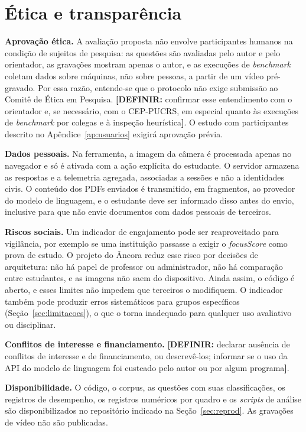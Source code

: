\documentclass[portuguese,oneside]{tcc}
\newcommand{\ferramenta}{Âncora\xspace}
\newcommand{\estr}[1]{\emph{#1}}
\newcommand{\fs}{\emph{focusScore}\xspace}
\newcommand{\definir}[1]{\textcolor{orange!75!black}{\textbf{[DEFINIR:} #1\textbf{]}}}
\begin{document}
\section{\label{sec:etica}Ética e transparência}

\textbf{Aprovação ética.} A avaliação proposta não envolve participantes humanos na condição de sujeitos de pesquisa: as questões são avaliadas pelo autor e pelo orientador, as gravações mostram apenas o autor, e as execuções de \estr{benchmark} coletam dados sobre máquinas, não sobre pessoas, a partir de um vídeo pré-gravado. Por essa razão, entende-se que o protocolo não exige submissão ao Comitê de Ética em Pesquisa. \definir{confirmar esse entendimento com o orientador e, se necessário, com o CEP-PUCRS, em especial quanto às execuções de \estr{benchmark} por colegas e à inspeção heurística}. O estudo com participantes descrito no Apêndice~\ref{ap:usuarios} exigirá aprovação prévia.

\textbf{Dados pessoais.} Na ferramenta, a imagem da câmera é processada apenas no navegador e só é ativada com a ação explícita do estudante. O servidor armazena as respostas e a telemetria agregada, associadas a sessões e não a identidades civis. O conteúdo dos PDFs enviados é transmitido, em fragmentos, ao provedor do modelo de linguagem, e o estudante deve ser informado disso antes do envio, inclusive para que não envie documentos com dados pessoais de terceiros.

\textbf{Riscos sociais.} Um indicador de engajamento pode ser reaproveitado para vigilância, por exemplo se uma instituição passasse a exigir o \fs como prova de estudo. O projeto do \ferramenta reduz esse risco por decisões de arquitetura: não há papel de professor ou administrador, não há comparação entre estudantes, e as imagens não saem do dispositivo. Ainda assim, o código é aberto, e esses limites não impedem que terceiros o modifiquem. O indicador também pode produzir erros sistemáticos para grupos específicos (Seção~\ref{sec:limitacoes}), o que o torna inadequado para qualquer uso avaliativo ou disciplinar.

\textbf{Conflitos de interesse e financiamento.} \definir{declarar ausência de conflitos de interesse e de financiamento, ou descrevê-los; informar se o uso da API do modelo de linguagem foi custeado pelo autor ou por algum programa}.

\textbf{Disponibilidade.} O código, o corpus, as questões com suas classificações, os registros de desempenho, os registros numéricos por quadro e os \estr{scripts} de análise são disponibilizados no repositório indicado na Seção~\ref{sec:reprod}. As gravações de vídeo não são publicadas.
\end{document}
